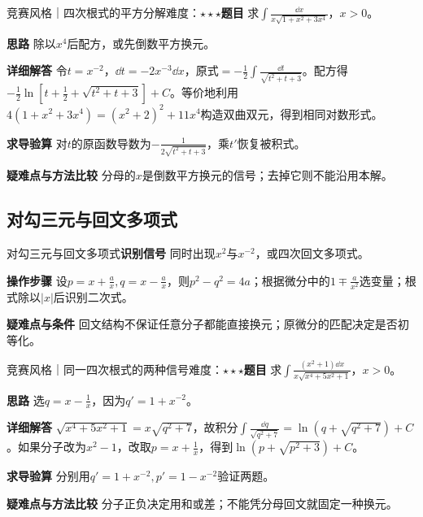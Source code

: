 \begin{example}{竞赛风格｜四次根式的平方分解}{难度：$\star\star\star$}\label{ic:ex:indefinite_dual_complete:quarticidentity}\textbf{题目} 求$\int\frac{\dd x}{x\sqrt{1+x^2+3x^4}}$，$x>0$。\par \textbf{思路} 除以$x^4$后配方，或先倒数平方换元。\par \textbf{详细解答} 令$t=x^{-2}$，$\dd t=-2x^{-3}\dd x$，原式$=-\frac12\int\frac{\dd t}{\sqrt{t^2+t+3}}$。配方得$-\frac12\ln[t+\frac{1}{2}+\sqrt{t^2+t+3}]+C$。等价地利用$4(1+x^2+3x^4)=(x^2+2)^2+11x^4$构造双曲双元，得到相同对数形式。\par \textbf{求导验算} 对$t$的原函数导数为$-\frac{1}{2\sqrt{t^2+t+3}}$，乘$t'$恢复被积式。\par \textbf{疑难点与方法比较} 分母的$x$是倒数平方换元的信号；去掉它则不能沿用本解。\end{example}

\subsection{对勾三元与回文多项式}\label{ic:indefinite_dual_complete:reciprocal}\begin{method}{对勾三元与回文多项式}\textbf{识别信号} 同时出现$x^2$与$x^{-2}$，或四次回文多项式。\par \textbf{操作步骤} 设$p=x+\frac{a}{x},q=x-\frac{a}{x}$，则$p^2-q^2=4a$；根据微分中的$1\mp \frac{a}{x^2}$选变量；根式除以$|x|$后识别二次式。\par \textbf{疑难点与条件} 回文结构不保证任意分子都能直接换元；原微分的匹配决定是否初等化。\end{method}

\begin{example}{竞赛风格｜同一四次根式的两种信号}{难度：$\star\star\star$}\label{ic:ex:indefinite_dual_complete:reciprocalplus}\textbf{题目} 求$\int\frac{(x^2+1)\dd x}{x\sqrt{x^4+5x^2+1}}$，$x>0$。\par \textbf{思路} 选$q=x-\frac{1}{x}$，因为$q'=1+x^{-2}$。\par \textbf{详细解答} $\sqrt{x^4+5x^2+1}=x\sqrt{q^2+7}$，故积分$\int\frac{\dd q}{\sqrt{q^2+7}}=\ln(q+\sqrt{q^2+7})+C$。如果分子改为$x^2-1$，改取$p=x+\frac{1}{x}$，得到$\ln(p+\sqrt{p^2+3})+C$。\par \textbf{求导验算} 分别用$q'=1+x^{-2},p'=1-x^{-2}$验证两题。\par \textbf{疑难点与方法比较} 分子正负决定用和或差；不能凭分母回文就固定一种换元。\end{example}

